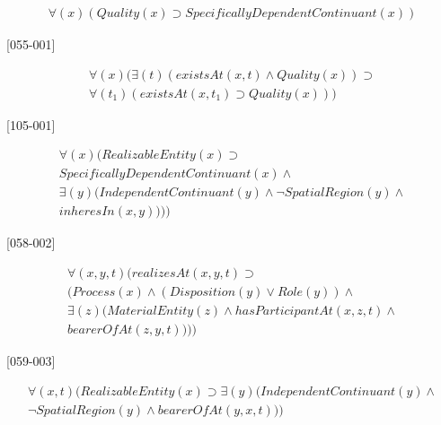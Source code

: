 \documentclass{article}
\begin{document}
\begin{flushright}
[054-002] 

\begin{equation}
\begin{split}
{\forall}(x)(Quality(x) \supset SpecificallyDependentContinuant(x))
\end{split}
\end{equation}

[055-001] 

\begin{equation}
\begin{split}
{\forall}(x)({\exists}(t)(existsAt(x, t) \wedge Quality(x)) \supset \\
{\forall}(t_1)(existsAt(x, t_1) \supset Quality(x)))
\end{split}
\end{equation}

[105-001] 

\begin{equation}
\begin{split}
{\forall}(x)(RealizableEntity(x) \supset \\
SpecificallyDependentContinuant(x) \wedge \\
{\exists}(y)(IndependentContinuant(y) \wedge {\neg}SpatialRegion(y) \wedge \\
inheresIn(x, y))))
\end{split}
\end{equation}

[058-002] 

\begin{equation}
\begin{split}
{\forall}(x, y, t)(realizesAt(x, y, t) \supset \\
(Process(x) \wedge (Disposition(y) \vee Role(y)) \wedge \\
{\exists}(z)(MaterialEntity(z) \wedge hasParticipantAt(x, z, t) \wedge \\
bearerOfAt(z, y, t))))
\end{split}
\end{equation}

[059-003] 

\begin{equation}
\begin{split}
{\forall}(x, t)(RealizableEntity(x) \supset {\exists}(y)(IndependentContinuant(y) \wedge \\
{\neg}SpatialRegion(y) \wedge bearerOfAt(y, x, t)))
\end{split}
\end{equation}


\end{flushright}
\end{document}
